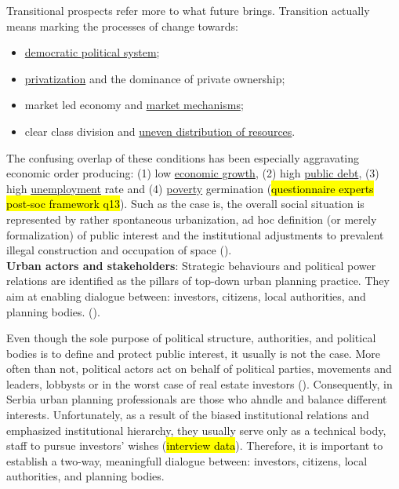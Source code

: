 \documentclass[11pt]{report}
\begin{document}
\begin{itemize}
Transitional prospects refer more to what future brings. Transition actually means marking the processes of change towards:

\begin{itemize}
\item \underline{democratic political system};
\item \underline{privatization} and the dominance of private ownership;
\item market led economy and \underline{market mechanisms};
\item clear class division and \underline{uneven distribution of resources}.
\end{itemize}

The confusing overlap of these conditions has been especially aggravating economic order producing:
(1) low \underline{economic growth},
(2) high \underline{public debt},
(3) high \underline{unemployment} rate
and
(4) \underline{poverty} germination (\hl{questionnaire experts post-soc framework q13}).
Such as the case is, the overall social situation is represented by rather spontaneous urbanization, ad hoc definition (or merely formalization) of public interest and the institutional adjustments to prevalent illegal construction and occupation of space (\cite{Urbani razvoj u Srbiji Ministry of Space 2014}).
\\

\textbf{Urban actors and stakeholders}:
Strategic behaviours and political power relations are identified as the pillars of top-down urban planning practice.
They aim at enabling dialogue between: investors, citizens, local authorities, and planning bodies.
(\cite{Vujosevic 2004 Belgrade Metropolitan Area Governance}).

Even though the sole purpose of political structure, authorities, and political bodies is to define and protect public interest, it usually is not the case.
More often than not, political actors act on behalf of political parties, movements and leaders, lobbysts or in the worst case of real estate investors (\cite{Urbani razvoj u Srbiji Ministry of Space 2014}).
Consequently, in Serbia urban planning professionals are those who ahndle and balance different interests. Unfortunately, as a result of the biased institutional relations and emphasized institutional hierarchy, they usually serve only as a technical body, staff to pursue investors' wishes (\hl{interview data}).
Therefore, it is important to establish a two-way, meaningfull dialogue between: investors, citizens, local authorities, and planning bodies.


\end{itemize}
\end{document}
